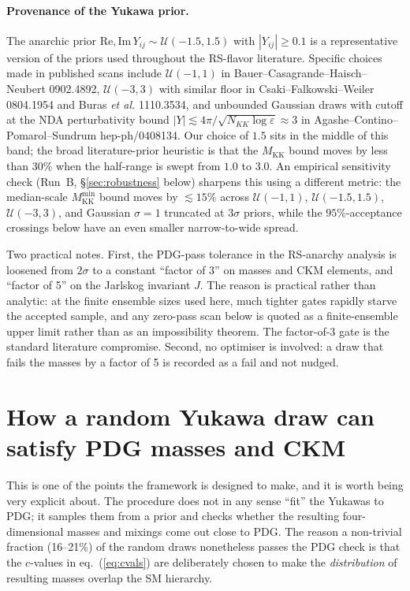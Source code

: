 \documentclass[11pt]{article}
\newcommand{\Mkk}{M_{\mathrm{KK}}}
\begin{document}
\paragraph{Provenance of the Yukawa prior.}
The anarchic prior $\mathrm{Re},\mathrm{Im}\,Y_{ij}\sim
\mathcal{U}(-1.5,1.5)$ with $|Y_{ij}|\ge 0.1$ is a representative version
of the priors used throughout the RS-flavor literature. Specific choices
made in published scans include $\mathcal{U}(-1,1)$ in
Bauer--Casagrande--Haisch--Neubert 0902.4892, $\mathcal{U}(-3,3)$ with
similar floor in Csaki--Falkowski--Weiler 0804.1954 and Buras \emph{et
al.} 1110.3534, and unbounded Gaussian draws with cutoff at the NDA
perturbativity bound $|Y|\lesssim 4\pi/\sqrt{N_{KK}\log\varepsilon}\approx
3$ in Agashe--Contino--Pomarol--Sundrum hep-ph/0408134. Our choice of
$1.5$ sits in the middle of this band; the broad literature-prior
heuristic is that the $\Mkk$ bound moves by less than $30\%$ when the
half-range is swept from $1.0$ to $3.0$. An empirical sensitivity check
(Run~B, \S\ref{sec:robustness} below) sharpens this using a different
metric: the median-scale $\Mkk^{\min}$ bound moves by $\lesssim 15\%$
across $\mathcal{U}(-1,1)$, $\mathcal{U}(-1.5,1.5)$,
$\mathcal{U}(-3,3)$, and Gaussian $\sigma=1$ truncated at $3\sigma$
priors, while the $95\%$-acceptance crossings below have an even smaller
narrow-to-wide spread.

Two practical notes. First, the PDG-pass tolerance in the RS-anarchy
analysis is loosened from $2\sigma$ to a constant ``factor of 3'' on
masses and CKM elements, and ``factor of 5'' on the Jarlskog
invariant $J$. The reason is practical rather than analytic: at the
finite ensemble sizes used here, much tighter gates rapidly starve the
accepted sample, and any zero-pass scan below is quoted as a
finite-ensemble upper limit rather than as an impossibility theorem. The
factor-of-3 gate is the standard literature compromise. Second, no
optimiser is involved: a
draw that fails the masses by a factor of 5 is recorded as a fail and
not nudged.

\section{How a random Yukawa draw can satisfy PDG masses and CKM}
\label{sec:how-anarchic-passes}

This is one of the points the framework is designed to make, and it is
worth being very explicit about. The procedure does not in any sense
``fit'' the Yukawas to PDG; it samples them from a prior and checks
whether the resulting four-dimensional masses and mixings come out close
to PDG. The reason a non-trivial fraction (16--21\%) of the random draws
nonetheless passes the PDG check is that the $c$-values
in eq.~(\ref{eq:cvals}) are deliberately chosen to make the
\emph{distribution} of resulting masses overlap the SM hierarchy.
\end{document}
